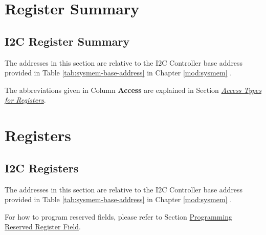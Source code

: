 \documentclass[main\_\_EN.tex]{subfiles}
\begin{document}

\newpage
\section{Register Summary}

\subsection{I2C Register Summary}
\label{sec:i2c-reg-summ}
\hypertarget{i2c-reg-summ}{}

The addresses in this section are relative to the I2C Controller base address provided in Table \ref{tab:sysmem-base-address} in Chapter \ref{mod:sysmem} \textit{}.

The abbreviations given in Column \textbf{Access} are explained in Section \hyperref[glossary-access-types]{\textit{Access Types for Registers}}.





\newpage
\section{Registers}

\subsection{I2C Registers}

The addresses in this section are relative to the I2C Controller base address provided in Table \ref{tab:sysmem-base-address} in Chapter \ref{mod:sysmem} \textit{}.

For how to program reserved fields, please refer to Section \hyperref[programming-reserved-field]{Programming Reserved Register Field}.


\end{document}
